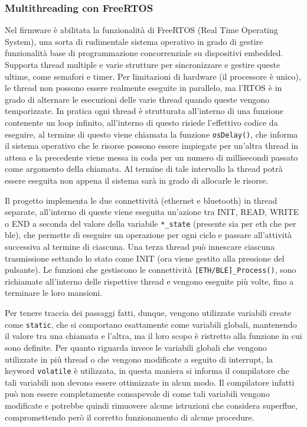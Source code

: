 \subsubsection{Multithreading con FreeRTOS}

Nel firmware \`e abilitata la funzionalit\`a di FreeRTOS (Real Time Operating System), una sorta di rudimentale sistema operativo in grado di gestire funzionalit\`a base di programmazione concorrenziale su dispositivi embedded. Supporta thread multiple e varie strutture per sincronizzare e gestire queste ultime, come semafori e timer. Per limitazioni di hardware (il processore \`e unico), le thread non possono essere realmente eseguite in parallelo, ma l'RTOS \`e in grado di alternare le esecuzioni delle varie thread quando queste vengono temporizzate. In pratica ogni thread \`e strutturata all'interno di una funzione contenente un loop infinito, all'interno di questo risiede l'effettivo codice da eseguire, al termine di questo viene chiamata la funzione \texttt{osDelay()}, che informa il sistema operativo che le risorse possono essere impiegate per un'altra thread in attesa e la precedente viene messa in coda per un numero di millisecondi passato come argomento della chiamata. Al termine di tale intervallo la thread potr\`a essere eseguita non appena il sistema sar\`a in grado di allocarle le risorse.

Il progetto implementa le due connettivit\`a (ethernet e bluetooth) in thread separate, all'interno di queste viene eseguita un'azione tra INIT, READ, WRITE o END a seconda del valore della variabile \texttt{*\_state} (presente sia per eth che per ble), che permette di eseguire un operazione per ogni ciclo e passare all'attivit\`a successiva al termine di ciascuna. Una terza thread pu\`o innescare ciascuna trasmissione settando lo stato come INIT (ora viene gestito alla pressione del pulsante). Le funzioni che gestiscono le connettivit\`a \texttt{[ETH/BLE]\_Process()}, sono richiamate all'interno delle rispettive thread e vengono eseguite pi\`u volte, fino a terminare le loro mansioni.

Per tenere traccia dei passaggi fatti, dunque, vengono utilizzate variabili create come \texttt{static}, che si comportano esattamente come variabili globali, mantenendo il valore tra una chiamata e l'altra, ma il loro scopo \`e ristretto alla funzione in cui sono definite. Per quanto riguarda invece le variabili globali che vengono utilizzate in pi\`u thread o che vengono modificate a seguito di interrupt, la keyword \texttt{volatile} \`e utilizzata, in questa maniera si informa il compilatore che tali variabili non devono essere ottimizzate in alcun modo. Il compilatore infatti pu\`o non essere completamente consapevole di come tali variabili vengono modificate e potrebbe quindi rimuovere alcune istruzioni che considera superflue, compromettendo per\`o il corretto funzionamento di alcune procedure.

